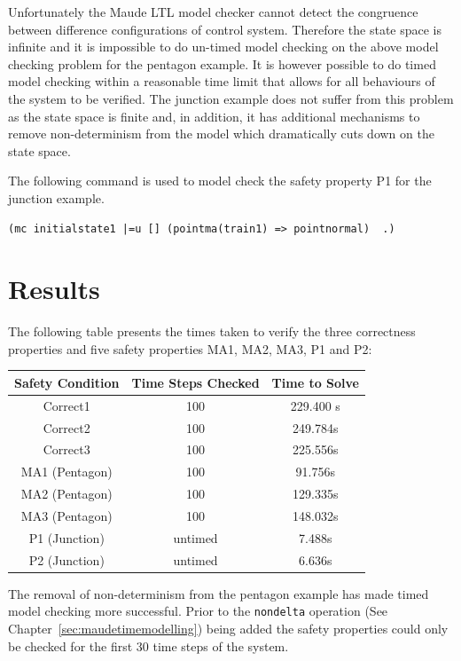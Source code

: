 Unfortunately the Maude LTL model checker cannot detect the congruence between difference configurations of control system. Therefore the state space is infinite and it is impossible to do un-timed model checking on the above model checking problem for the pentagon example. It is however possible to do timed model checking within a reasonable time limit that allows for all behaviours of the system to be verified. The junction example does not suffer from this problem as the state space is finite and, in addition, it has additional mechanisms to remove non-determinism from the model which dramatically cuts down on the state space.

The following command is used to model check the safety property P1 for the junction example.

\begin{lstlisting}[caption = The model checking command the point does not move property]
(mc initialstate1 |=u [] (pointma(train1) => pointnormal)  .)
\end{lstlisting}

\section{Results}
The following table presents the times taken to verify the three correctness properties and five safety properties MA1, MA2, MA3, P1 and P2:
\medskip
\begin{center}
\begin{tabular}{c | c | c} 
Safety Condition & Time Steps Checked & Time to Solve  \\ \hline
Correct1 & 100 & 229.400 s\\
Correct2 & 100 & 249.784s\\
Correct3 & 100 & 225.556s\\
MA1 (Pentagon)& 100 & 91.756s  \\
MA2 (Pentagon)& 100 &129.335s \\ 
MA3 (Pentagon)& 100 &148.032s \\
P1 (Junction)& untimed &7.488s \\
P2 (Junction)& untimed & 6.636s \\
\end{tabular}
\end{center}
\medskip
The removal of non-determinism from the pentagon example has made timed model checking more successful. Prior to the \texttt{nondelta} operation (See Chapter~\ref{sec:maudetimemodelling}) being added the safety properties could only be checked for the first 30 time steps of the system.

